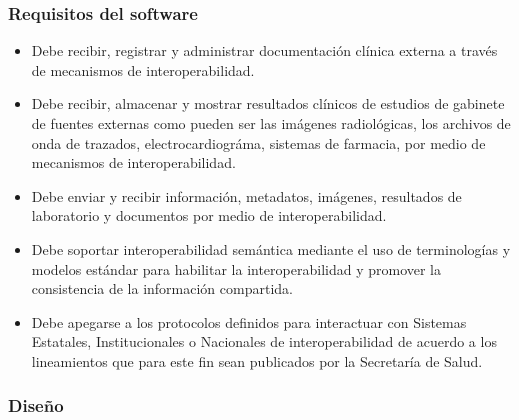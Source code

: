           \subsubsection{Requisitos del software}
          \begin{itemize}
            \item Debe recibir, registrar y administrar documentación clínica externa a través de mecanismos de interoperabilidad.
            \item Debe recibir, almacenar y mostrar resultados clínicos de estudios de gabinete de fuentes externas como pueden ser las imágenes radiológicas, los archivos de onda de trazados, electrocardiográma, sistemas de farmacia, por medio de mecanismos de interoperabilidad.
            \item Debe enviar y recibir información, metadatos, imágenes, resultados de laboratorio y documentos por medio de interoperabilidad.
            \item Debe soportar interoperabilidad semántica mediante el uso de terminologías y modelos estándar para habilitar la interoperabilidad y promover la consistencia de la información compartida.
            \item Debe apegarse a los protocolos definidos para interactuar con Sistemas Estatales, Institucionales o Nacionales de interoperabilidad de acuerdo a los lineamientos que para este fin sean publicados por la Secretaría de Salud.

          \end{itemize}

          \subsubsection{Diseño}

